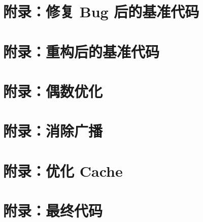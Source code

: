\documentclass[11pt]{article}
\begin{document}
  \pagebreak
  \appendix
  \lstset{
	  numbers=left,
  }

  \section{附录：修复 Bug 后的基准代码}
  \label{apd:fixed}
  
  \section{附录：重构后的基准代码}
  \label{apd:refactored}
  
  \section{附录：偶数优化}
  \label{apd:no_even}
  
  \section{附录：消除广播}
  \label{apd:no_cast}
  
  \section{附录：优化 Cache}
  \label{apd:better_cache}
  
  \section{附录：最终代码}
  \label{apd:final_version}
  
\end{document}
